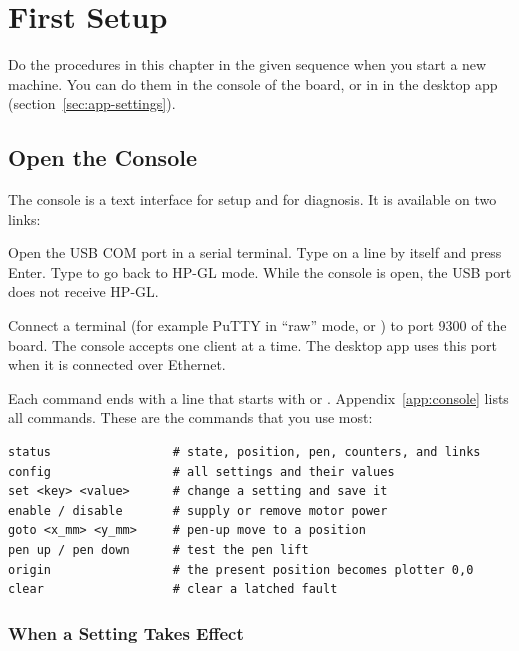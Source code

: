 \chapter{First Setup}\label{ch:setup}

Do the procedures in this chapter in the given sequence when you start a new
machine. You can do them in the console of the board, or in
 in the desktop app (section~\ref{sec:app-settings}).

\section{Open the Console}\label{sec:console}

The console is a text interface for setup and for diagnosis. It is available
on two links:

\begin{description}[style=nextline,leftmargin=1.2em,font=\sffamily\bfseries\color{navy}]
  \item[USB] Open the USB COM port in a serial terminal. Type  on a
        line by itself and press Enter. Type  to go back to HP-GL
        mode. While the console is open, the USB port does not receive HP-GL.
  \item[TCP port 9300] Connect a terminal (for example PuTTY in ``raw'' mode,
        or ) to port 9300 of the board. The console accepts one
        client at a time. The desktop app uses this port when it is connected
        over Ethernet.
\end{description}

Each command ends with a line that starts with  or .
Appendix~\ref{app:console} lists all commands. These are the commands that
you use most:

\begin{lstlisting}[language=console]
status                 # state, position, pen, counters, and links
config                 # all settings and their values
set <key> <value>      # change a setting and save it
enable / disable       # supply or remove motor power
goto <x_mm> <y_mm>     # pen-up move to a position
pen up / pen down      # test the pen lift
origin                 # the present position becomes plotter 0,0
clear                  # clear a latched fault
\end{lstlisting}

\subsection{When a Setting Takes Effect}

